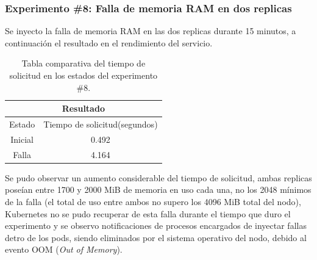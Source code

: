 \subsubsection{Experimento \#8: Falla de memoria RAM en dos replicas}

\par Se inyecto la falla de memoria RAM en las dos replicas durante 15 minutos, a continuación el resultado en el rendimiento del servicio.\\

\begin{table}[ht!]
\begin{center}
\begin{tabular}{ |c|c| } 
 \hline
 \multicolumn{2}{|c|}{Resultado} \\
 \hline
 \hline
 Estado & Tiempo de solicitud(segundos)\\
 \hline
 Inicial & 0.492\\
 Falla & 4.164\\
 \hline
\end{tabular}
\end{center}
\caption{Tabla comparativa del tiempo de solicitud en los estados del experimento \#8.}
\label{tab:tabla52}
\end{table}

\par Se pudo observar un aumento considerable del tiempo de solicitud, ambas replicas poseían entre 1700 y 2000 MiB de memoria en uso cada una, no los 2048 mínimos de la falla (el total de uso entre ambos no supero los 4096 MiB total del nodo), Kubernetes no se pudo recuperar de esta falla durante el tiempo que duro el experimento y se observo notificaciones de procesos encargados de inyectar fallas detro de los pods, siendo eliminados por el sistema operativo del nodo, debido al evento OOM (\textit{Out of Memory}).\\
